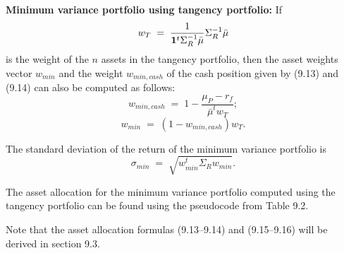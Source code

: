 
\noindent\textbf{Minimum variance portfolio using tangency portfolio:} If
\[
w_T \;=\; \frac{1}{\mathbf{1}^t\Sigma_R^{-1}\bar\mu}\Sigma_R^{-1}\bar\mu
\]
is the weight of the $n$ assets in the tangency portfolio, then the asset weights
vector $w_{min}$ and the weight $w_{min,cash}$ of the cash position given by (9.13) and
(9.14) can also be computed as follows:
\begin{equation}
w_{min,cash} \;=\; 1 - \frac{\mu_P-r_f}{\bar\mu^tw_T};
\end{equation}
\begin{equation}
w_{min} \;=\; (1-w_{min,cash})w_T.
\end{equation}

The standard deviation of the return of the minimum variance portfolio is
\[
\sigma_{min} \;=\; \sqrt{w_{min}^t\Sigma_Rw_{min}}.
\]

The asset allocation for the minimum variance portfolio computed using the tangency
portfolio can be found using the pseudocode from Table 9.2.

\begin{table}[H]
\centering
\caption{Asset allocation of minimum variance portfolio from tangency portfolio}
\end{table}

Note that the asset allocation formulas (9.13--9.14) and (9.15--9.16) will be derived in
section 9.3.
